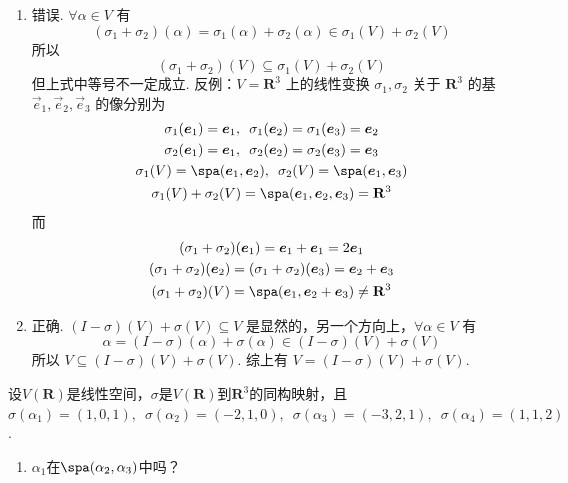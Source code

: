 \begin{exercise}
\begin{exgroup}
\begin{answer}
\begin{enumerate}
                \item \label{item:6:B:2:3}
                      错误. $ \forall \alpha \in V $ 有
                      \[ (\sigma_1 + \sigma_2)(\alpha) = \sigma_1(\alpha) + \sigma_2(\alpha) \in \sigma_1(V) + \sigma_2(V) \]
                      所以
                      \[ (\sigma_1 + \sigma_2)(V) \subseteq \sigma_1(V) + \sigma_2(V) \]
                      但上式中等号不一定成立. 反例：$ V = \mathbf{R}^3 $ 上的线性变换 $ \sigma_1, \sigma_2 $ 关于 $ \mathbf{R}^3 $ 的基 $ \vec{e}_1, \vec{e}_2, \vec{e}_3 $ 的像分别为
                      \begin{gather*}
                          \sigma_1(\vec{e}_1) = \vec{e}_1,\enspace \sigma_1(\vec{e}_2) = \sigma_1(\vec{e}_3) = \vec{e}_2 \\
                          \sigma_2(\vec{e}_1) = \vec{e}_1,\enspace \sigma_2(\vec{e}_2) = \sigma_2(\vec{e}_3) = \vec{e}_3 \\
                          \sigma_1(V) = \spa(\vec{e}_1, \vec{e}_2),\enspace \sigma_2(V) = \spa(\vec{e}_1, \vec{e}_3) \\
                          \sigma_1(V) + \sigma_2(V) = \spa(\vec{e}_1, \vec{e}_2, \vec{e}_3) = \mathbf{R}^3
                      \end{gather*}
                      而
                      \begin{gather*}
                          (\sigma_1 + \sigma_2)(\vec{e}_1) = \vec{e}_1 + \vec{e}_1 = 2 \vec{e}_1 \\
                          (\sigma_1 + \sigma_2)(\vec{e}_2) = (\sigma_1 + \sigma_2)(\vec{e}_3) = \vec{e}_2 + \vec{e}_3 \\
                          (\sigma_1 + \sigma_2)(V) = \spa(\vec{e}_1, \vec{e}_2 + \vec{e}_3) \neq \mathbf{R}^3
                      \end{gather*}

                \item 正确. $(I - \sigma)(V) + \sigma(V) \subseteq V$ 是显然的，另一个方向上，$ \forall \alpha \in V $ 有
                      \[ \alpha = (I - \sigma)(\alpha) + \sigma(\alpha) \in (I - \sigma)(V) + \sigma(V) \]
                      所以 $ V \subseteq (I - \sigma)(V) + \sigma(V) $. 综上有 $ V = (I - \sigma)(V) + \sigma(V) $.
            \end{enumerate}
        \end{answer}

        \item 设$V(\mathbf{R})$是线性空间，$\sigma$是$V(\mathbf{R})$到$\mathbf{R}^3$的同构映射，且$\sigma(\alpha_1)=(1,0,1),\enspace\allowbreak\sigma(\alpha_2)=(-2,1,0),\enspace\allowbreak\sigma(\alpha_3)=(-3,2,1),\enspace\allowbreak\sigma(\alpha_4)=(1,1,2)$.
        \begin{enumerate}
            \item $\alpha_1$在$\spa(\alpha_2,\alpha_3)$中吗？


\end{enumerate}
\end{exgroup}
\end{exercise}
